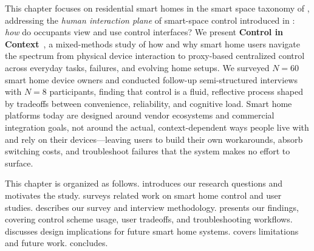 This chapter focuses on residential smart homes in the smart space taxonomy of , addressing the \emph{human interaction plane} of smart-space control introduced in : \emph{how} do occupants view and use control interfaces? We present \textbf{Control in Context}~\cite{controlincontext}, a mixed-methods study of how and why smart home users navigate the spectrum from physical device interaction to proxy-based centralized control across everyday tasks, failures, and evolving home setups. We surveyed $N=60$ smart home device owners and conducted follow-up semi-structured interviews with $N=8$ participants, finding that control is a fluid, reflective process shaped by tradeoffs between convenience, reliability, and cognitive load. Smart home platforms today are designed around vendor ecosystems and commercial integration goals, not around the actual, context-dependent ways people live with and rely on their devices---leaving users to build their own workarounds, absorb switching costs, and troubleshoot failures that the system makes no effort to surface.

This chapter is organized as follows.  introduces our research questions and motivates the study.  surveys related work on smart home control and user studies.  describes our survey and interview methodology.  presents our findings, covering control scheme usage, user tradeoffs, and troubleshooting workflows.  discusses design implications for future smart home systems.  covers limitations and future work.  concludes.
